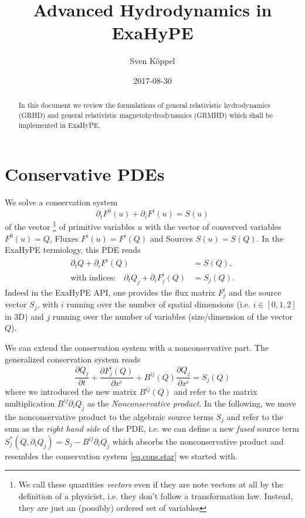 \documentclass[a4paper]{article}
\title{Advanced Hydrodynamics in ExaHyPE}
\author{Sven Köppel}
\date{2017-08-30}
\newcommand{\pp}[2]{\frac{\partial #1}{\partial #2}}
\begin{document}
\maketitle

\begin{abstract}
In this document we review the formulations of general
relativistic hydrodynamics (GRHD) and general relativistic
magnetohydrodynamics (GRMHD) which shall be implemented in
ExaHyPE.
\end{abstract}

\tableofcontents

\section{Conservative PDEs}

We solve a conservation system
\begin{equation}\label{eq.cons.star}
\partial_t F^0(u) + \partial_i F^i(u) = S(u)
\end{equation}
of the vector%
\footnote{We call these quantities \emph{vectors} even if they
are note vectors at all by the definition of a physicist, i.e.
they don't follow a transformation law. Instead, they are just
an (possibly) ordered set of variables}
of primitive variables $u$ with the vector of converved variables
$F^0(u)=Q$, Fluxes $F^i(u)=F^i(Q)$ and Sources $S(u)=S(Q)$. In the
ExaHyPE termiology, this PDE reads
\begin{align}
\partial_t Q + \partial_i F^i(Q) &= S(Q), \\
\text{with indices:}\quad
\partial_t Q_j + \partial_i F^i_j(Q) &= S_j(Q).
\end{align}
Indeed in the ExaHyPE API, one provides the flux matrix
$F^i_j$ and the source vector $S_j$, with $i$ running over the
number of spatial dimensions (i.e. $i\in[0,1,2]$ in 3D) and $j$
running over the number of variables (size/dimension of the vector $Q$).

We can extend the conservation system with a nonconservative part.
The generalized conservation system reads
\begin{equation}
\pp {Q_j}t + \pp {F^i_j(Q)}{x^i} + B^{ij}(Q) \pp {Q_j}{x^i} = S_j(Q)
\end{equation}
where we introduced the new matrix $B^{ij}(Q)$ and refer to the
matrix multiplication $B^{ij}\partial_i Q_j$ as the
\emph{Nonconservative product}. In the following, we move the
nonconservative product to the algebraic source terms $S_j$
and refer to the sum as the \emph{right hand side} of the PDE,
i.e. we can define a new \emph{fused} source term
$S^*_j(Q, \partial_i Q_j)=S_j - B^{ij}\partial_i Q_j$
which absorbs the nonconservative product and resembles the
conservation system \eqref{eq.cons.star} we started with.
\end{document}
